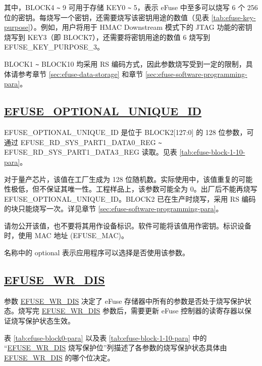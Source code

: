 \documentclass[main\_\_CN.tex]{subfiles}
\begin{document}






其中，BLOCK4 \verb+~+ 9 可用于存储 KEY0 \verb+~+ 5，表示 eFuse 中至多可以烧写 6 个 256 位的密钥。每烧写一个密钥，还需要烧写该密钥用途的数值（见表 \ref{tab:efuse-key-purpose}）。例如，用户将用于 HMAC Downstream 模式下的 JTAG 功能的密钥烧写到 KEY\textcolor{myred}{3}（即 BLOCK7），还需要将密钥用途的数值 6 烧写到 EFUSE\_KEY\_PURPOSE\_\textcolor{myred}{3}。

BLOCK1 \verb+~+ BLOCK10 均采用 RS 编码方式，因此参数烧写受到一定的限制，具体请参考章节 \ref{sec:efuse-data-storage} 和章节 \ref{sec:efuse-software-programming-para}。

\subsection{\texorpdfstring{\hyperref[fielddesc:EFUSEOPTIONALUNIQUEID]{EFUSE\_OPTIONAL\_UNIQUE\_ID}}{EFUSE\_OPTIONAL\_UNIQUE\_ID}}
\label{sec:efuse-optional-unique-id}

EFUSE\_OPTIONAL\_UNIQUE\_ID 是位于 BLOCK2[127:0] 的 128 位参数，可通过 EFUSE\_RD\_SYS\_PART1\_DATA0\_REG \verb+~+ EFUSE\_RD\_SYS\_PART1\_DATA3\_REG 读取。见表 \ref{tab:efuse-block-1-10-para}。

对于量产芯片，该值在工厂生成为 128 位随机数。实际使用中，该值重复的可能性极低，但不保证其唯一性。工程样品上，该参数可能全为 0。出厂后不能再烧写 EFUSE\_OPTIONAL\_UNIQUE\_ID。BLOCK2 已在生产时烧写，采用 RS 编码的块只能烧写一次。详见章节 \ref{sec:efuse-software-programming-para}。

请勿公开该值，也不要将其用作设备标识。软件可能将该值用作密钥。标识设备时，使用 MAC 地址 (EFUSE\_MAC)。

名称中的 optional 表示应用程序可以选择是否使用该参数。

\subsection{\hyperref[fielddesc:EFUSEWRDIS]{EFUSE\_WR\_DIS}}
\label{sec:efuse-wr-dis}

参数 \hyperref[fielddesc:EFUSEWRDIS]{EFUSE\_WR\_DIS} 决定了 eFuse 存储器中所有的参数是否处于烧写保护状态。烧写完 \hyperref[fielddesc:EFUSEWRDIS]{EFUSE\_WR\_DIS} 参数后，需要更新 eFuse 控制器的读寄存器以保证烧写保护状态生效。

表 \ref{tab:efuse-block0-para} 以及表 \ref{tab:efuse-block-1-10-para} 中的 “\hyperref[fielddesc:EFUSEWRDIS]{EFUSE\_WR\_DIS} 烧写保护位”列描述了各参数的烧写保护状态具体由 \hyperref[fielddesc:EFUSEWRDIS]{EFUSE\_WR\_DIS} 的哪个位决定。
\end{document}
